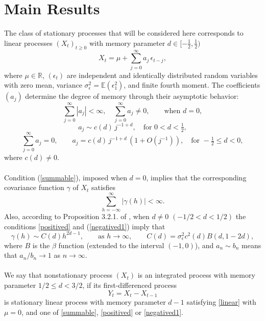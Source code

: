 \documentclass[10pt,a4paper]{amsart}
\numberwithin{equation}{section}
\begin{document}
\section{Main Results}\label{sec:2}
The class of stationary processes that will be considered here corresponds to linear processes \((X_t)_{t \ge 0}\)  with memory parameter \(d \in [-\tfrac{1}{2}, \tfrac{1}{2})\)   
\begin{equation}\label{linear}
X_t =\mu+\sum_{j=0}^\infty a_j\, \epsilon_{t-j},
\end{equation}
where $\mu\in\mathbb{R}$, \((\epsilon_t)\) are independent and identically distributed random variables with zero mean, variance \(\sigma_\epsilon^2 = \mathbb{E}(\epsilon_1^2)\), and finite fourth moment. 
The coefficients \((a_j)\) determine the degree of memory through their asymptotic behavior:
\begin{equation}\label{summable}
\sum_{j=0}^\infty |a_j| < \infty, \quad \sum_{j=0}^\infty a_j\neq0,\qquad\text{when } d = 0,
\end{equation}
\begin{equation}\label{positived}
a_j \sim c(d)\, j^{-1+d}, \quad \text{for } 0 < d < \tfrac{1}{2},
\end{equation}
\begin{equation}\label{negatived1}
\sum_{j=0}^\infty a_j = 0, \qquad 
a_j = c(d)\, j^{-1+d}\,(1 + O(j^{-1})), \quad \text{for } -\tfrac{1}{2} \le d < 0,
\end{equation}
where \(c(d) \neq 0\).  \\\\
    Condition (\ref{summable}), imposed when $d=0$, implies that the corresponding covariance function $\gamma$ of $X_t$ satisfies
 $$
 \sum_{h=-\infty}^\infty\vert\gamma(h)\vert<\infty.
 $$
 Also, according to Proposition 3.2.1. of \cite{MR2977317}, when $d\neq 0$ $(-1/2<d<1/2)$  the conditions \eqref{positived} and   (\ref{negatived1}) imply that
 \begin{equation}\label{gammad}
\gamma(h)\sim C(d) h^{2d-1},\qquad\textrm{as }h\to\infty,\qquad C(d)=\sigma^2_\epsilon c^2(d)B(d,1-2d),
 \end{equation}
 where $B$ is the $\beta$ function (extended to the interval $(-1,0)$), and 
 $a_n\sim b_n$ means that $a_n/b_n\to1$ as $n\to\infty$.\\\\
We say that nonstationary process \((X_t)\) is an integrated process with memory parameter \(1/2 \le d < 3/2\), if its first-differenced process
\[
Y_t = X_t - X_{t-1}
\]
is stationary linear  process with memory parameter \(d - 1\) satisfying \eqref{linear} with $\mu=0$, and  one of \eqref{summable}, \eqref{positived} or \eqref{negatived1}.
\end{document}
